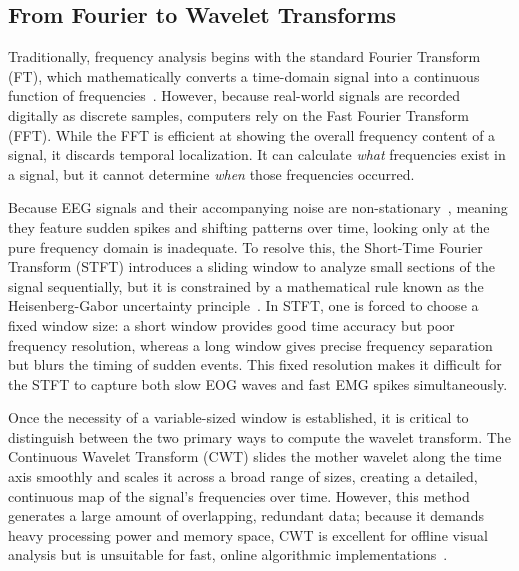 \documentclass[MScCS,12pt,oneside,final]{uccthesis}
\begin{document}
        \subsection{From Fourier to Wavelet Transforms}
        \label{subsec:fourier_to_wavelet}
        
        Traditionally, frequency analysis begins with the standard Fourier Transform (FT), which mathematically converts a time-domain signal into a continuous function of frequencies~\parencite{brigham1988fast}. However, because real-world signals are recorded digitally as discrete samples, computers rely on the Fast Fourier Transform (FFT). While the FFT is efficient at showing the overall frequency content of a signal, it discards temporal localization. It can calculate \textit{what} frequencies exist in a signal, but it cannot determine \textit{when} those frequencies occurred.
        
        Because EEG signals and their accompanying noise are non-stationary~\parencite{kaplan1999nonstationary}, meaning they feature sudden spikes and shifting patterns over time, looking only at the pure frequency domain is inadequate. To resolve this, the Short-Time Fourier Transform (STFT) introduces a sliding window to analyze small sections of the signal sequentially, but it is constrained by a mathematical rule known as the Heisenberg-Gabor uncertainty principle~\parencite{sejdic2009time}. In STFT, one is forced to choose a fixed window size: a short window provides good time accuracy but poor frequency resolution, whereas a long window gives precise frequency separation but blurs the timing of sudden events. This fixed resolution makes it difficult for the STFT to capture both slow EOG waves and fast EMG spikes simultaneously.

        Once the necessity of a variable-sized window is established, it is critical to distinguish between the two primary ways to compute the wavelet transform. The Continuous Wavelet Transform (CWT) slides the mother wavelet along the time axis smoothly and scales it across a broad range of sizes, creating a detailed, continuous map of the signal's frequencies over time. However, this method generates a large amount of overlapping, redundant data; because it demands heavy processing power and memory space, CWT is excellent for offline visual analysis but is unsuitable for fast, online algorithmic implementations~\parencite{addison2017illustrated}.
        
\end{document}
